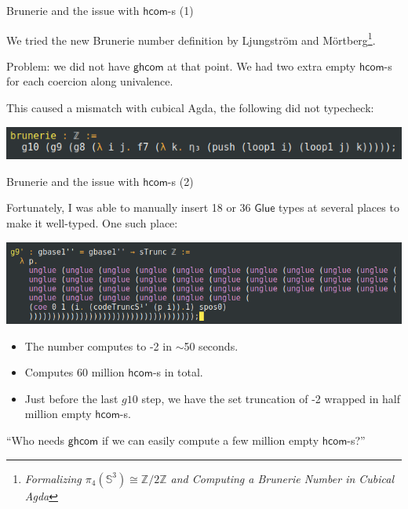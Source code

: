 \documentclass[dvipsnames]{beamer}
\newcommand{\ms}[1]{\mathsf{#1}}
\newcommand{\mbb}[1]{\mathbb{#1}}
\newcommand{\hcom}{\ms{hcom}}
\newcommand{\Glue}{\ms{Glue}}
\newcommand{\ghcom}{\ms{ghcom}}
\begin{document}
\begin{frame}{Brunerie and the issue with $\hcom$-s (1)}

We tried the new Brunerie number definition by Ljungström and Mörtberg\footnote{\emph{Formalizing $\pi_4(\mbb{S}^3) \cong \mbb{Z}/2\mbb{Z}$ and Computing a Brunerie Number in Cubical Agda}}.
\vspace{1em}

Problem: we did not have $\ghcom$ at that point. We had two extra empty $\hcom$-s
for each coercion along univalence.
\vspace{1em}

This caused a mismatch with cubical Agda, the following did not typecheck:
\vspace{1em}

\includegraphics[scale=0.5]{brunerie}
\end{frame}

\begin{frame}{Brunerie and the issue with $\hcom$-s (2)}

Fortunately, I was able to manually insert 18 or 36 $\Glue$ types
at several places to make it well-typed. One such place:
\vspace{0.5em}

\includegraphics[scale=0.45]{unglues}
\pause

\begin{itemize}
  \item The number computes to -2 in $\sim$50 seconds.
  \item Computes 60 million $\hcom$-s in total.
  \item Just before the last $g10$ step, we have the set truncation of -2 wrapped
        in half million empty $\hcom$-s.
\end{itemize}
\hspace{0.5em}
\pause

``Who needs $\ghcom$ if we can easily compute a few million empty $\hcom$-s?''

\end{frame}
\end{document}
